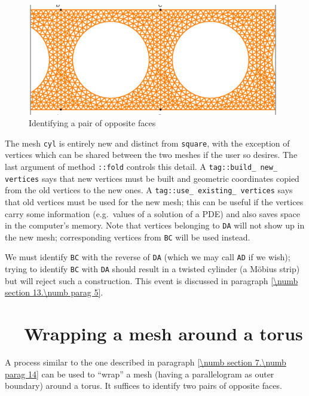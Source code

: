 \begin{figure}[ht] \centering
  \includegraphics[width=110mm]{cylinder-1.eps}
  \caption{Identifying a pair of opposite faces}
  \label{\numb section 7.\numb fig 10}
\end{figure}

The mesh {\small\tt cyl} is entirely new and distinct from {\small\tt square},
with the exception of vertices which can be shared between the two meshes if the
user so desires.
The last argument of method {\small\tt{}::fold} controls this detail.
A {\small\tt\textcolor{tag}{tag}::build\_\,new\_\,vertices} says that new vertices must be built
and geometric coordinates copied from the old vertices to the new ones.
A {\small\tt\textcolor{tag}{tag}::use\_\,existing\_\,vertices} says that old vertices must be used
for the new mesh; this can be useful if the vertices carry some information
(e.g.\ values of a solution of a PDE) and also saves space in the computer's memory.
Note that vertices belonging to {\small\tt DA} will not show up in the
new mesh; corresponding vertices from {\small\tt BC} will be used instead.

We must identify {\small\tt BC} with the reverse of {\small\tt DA} (which we may call
{\small\tt AD} if we wish); trying to identify {\small\tt BC} with {\small\tt DA} should
result in a twisted cylinder (a M\"obius strip) but {\maniFEM} will reject such a construction.
This event is discussed in paragraph \ref{\numb section 13.\numb parag 5}.


\section{~~Wrapping a mesh around a torus}\label{\numb section 7.\numb parag 15}

A process similar to the one described in paragraph \ref{\numb section 7.\numb parag 14}
can be used to ``wrap'' a mesh (having a parallelogram as outer boundary) around
a torus.
It suffices to identify two pairs of opposite faces.

